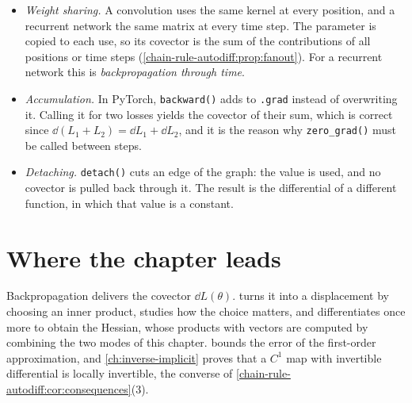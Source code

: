 \begin{notechapter}
\begin{mlthread}
\begin{itemize}[nosep]
  \item \emph{Weight sharing.} A convolution uses the same kernel at every
        position, and a recurrent network the same matrix at every time
        step. The parameter is copied to each use, so its covector is the
        sum of the contributions of all positions or time steps
        (\cref{chain-rule-autodiff:prop:fanout}). For a recurrent network
        this is \emph{backpropagation through time}.
  \item \emph{Accumulation.} In PyTorch, \texttt{backward()} adds to
        \texttt{.grad} instead of overwriting it. Calling it for two
        losses yields the covector of their sum, which is correct since
        $\dd(L_1 + L_2) = \dd L_1 + \dd L_2$, and it is the reason why
        \texttt{zero\_grad()} must be called between steps.
  \item \emph{Detaching.} \texttt{detach()} cuts an edge of the graph:
        the value is used, and no covector is pulled back through it. The
        result is the differential of a different function, in which that
        value is a constant.
\end{itemize}
\end{mlthread}

\section{Where the chapter leads}\label{chain-rule-autodiff:sec:outlook}

Backpropagation delivers the covector $\dd L(\theta)$.
 turns it into a displacement by choosing an
inner product, studies how the choice matters, and differentiates once
more to obtain the Hessian, whose products with vectors are computed by
combining the two modes of this chapter.
 bounds the error of the first-order
approximation, and \cref{ch:inverse-implicit} proves that a $C^1$ map
with invertible differential is locally invertible, the converse of
\cref{chain-rule-autodiff:cor:consequences}(3).


\end{notechapter}
